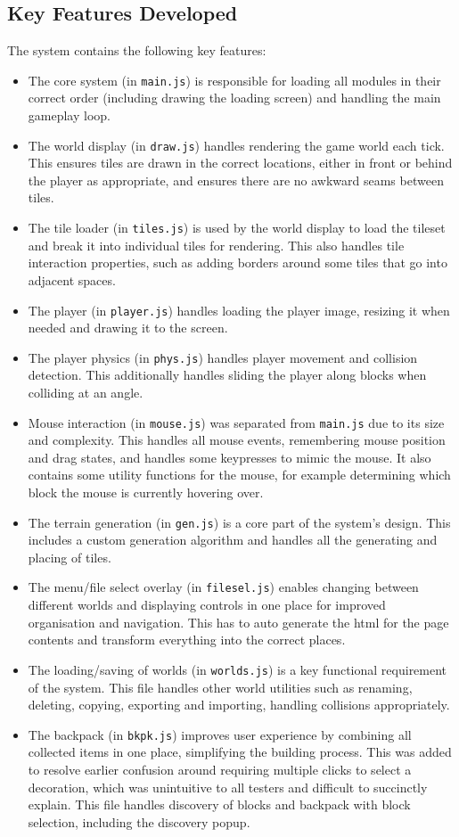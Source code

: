 \documentclass[14pt]{article}
\begin{document}
\subsection{Key Features Developed}
The system contains the following key features:
\begin{itemize}
  \item The core system (in \verb|main.js|) is responsible for loading all modules in their correct order (including drawing the loading screen) and handling the main gameplay loop.
  \item The world display (in \verb|draw.js|) handles rendering the game world each tick. This ensures tiles are drawn in the correct locations, either in front or behind the player as appropriate, and ensures there are no awkward seams between tiles.
  \item The tile loader (in \verb|tiles.js|) is used by the world display to load the tileset and break it into individual tiles for rendering. This also handles tile interaction properties, such as adding borders around some tiles that go into adjacent spaces.
  \item The player (in \verb|player.js|) handles loading the player image, resizing it when needed and drawing it to the screen.
  \item The player physics (in \verb|phys.js|) handles player movement and collision detection. This additionally handles sliding the player along blocks when colliding at an angle.
  \item Mouse interaction (in \verb|mouse.js|) was separated from \verb|main.js| due to its size and complexity. This handles all mouse events, remembering mouse position and drag states, and handles some keypresses to mimic the mouse. It also contains some utility functions for the mouse, for example determining which block the mouse is currently hovering over.
  \item The terrain generation (in \verb|gen.js|) is a core part of the system's design. This includes a custom generation algorithm and handles all the generating and placing of tiles.
  \item The menu/file select overlay (in \verb|filesel.js|) enables changing between different worlds and displaying controls in one place for improved organisation and navigation. This has to auto generate the html for the page contents and transform everything into the correct places.
  \item The loading/saving of worlds (in \verb|worlds.js|) is a key functional requirement of the system. This file handles other world utilities such as renaming, deleting, copying, exporting and importing, handling collisions appropriately.
  \item The backpack (in \verb|bkpk.js|) improves user experience by combining all collected items in one place, simplifying the building process. This was added to resolve earlier confusion around requiring multiple clicks to select a decoration, which was unintuitive to all testers and difficult to succinctly explain. This file handles discovery of blocks and backpack with block selection, including the discovery popup.
\end{itemize}
\end{document}
